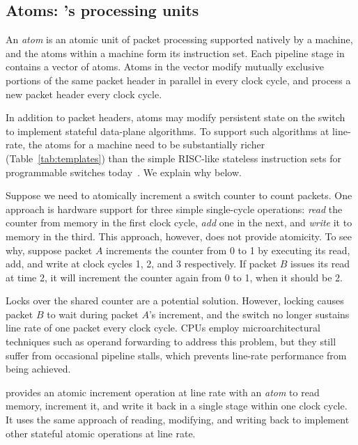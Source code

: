 \subsection{Atoms: \absmachine's processing units}
\label{ss:atoms}
 An {\em atom} is an atomic unit of packet processing supported natively by a
\absmachine machine, and the atoms within a \absmachine machine form its
instruction set. Each pipeline stage in \absmachine contains a vector of atoms.
Atoms in the vector modify mutually exclusive portions of the same packet
header in parallel in every clock cycle, and process a new packet header every
clock cycle.

In addition to packet headers, atoms may modify persistent state on the switch
to implement stateful data-plane algorithms. To support such algorithms at
line-rate, the atoms for a \absmachine machine need to be substantially richer
(Table~\ref{tab:templates}) than the simple RISC-like stateless instruction
sets for programmable switches today~\cite{rmt}. We explain why below.

Suppose we need to atomically increment a switch counter to count packets. One
approach is hardware support for three simple single-cycle operations:
\textit{read} the counter from memory in the first clock cycle, \textit{add}
one in the next, and \textit{write} it to memory in the third.  This approach,
however, does not provide atomicity. To see why, suppose packet $A$ increments
the counter from 0 to 1 by executing its read, add, and write at clock cycles
1, 2, and 3 respectively.  If packet $B$ issues its read at time 2, it will
increment the counter again from 0 to 1, when it should be 2.

Locks over the shared counter are a potential solution.  However, locking
causes packet $B$ to wait during packet $A$'s increment, and the switch no
longer sustains line rate of one packet every clock cycle. CPUs employ
microarchitectural techniques such as operand forwarding to address this
problem, but they still suffer from occasional pipeline stalls, which prevents
line-rate performance from being achieved.

\absmachine provides an atomic increment operation at line rate with an {\em
atom} to read memory, increment it, and write it back in a single stage within
one clock cycle. It uses the same approach of reading, modifying, and writing
back to implement other stateful atomic operations at line rate.

